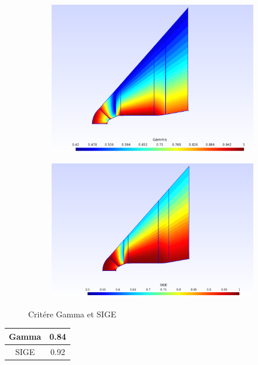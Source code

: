 \begin{figure}[H]
\begin{center}
\begin{subfigure}{0.48\textwidth}
\includegraphics[width=\textwidth]{chapter1_introduction/pictures/gmsh/gamma.png}
\end{subfigure}
\begin{subfigure}{0.48\textwidth}
\includegraphics[width=\textwidth]{chapter1_introduction/pictures/gmsh/critere1.png}
\end{subfigure}
\caption{Critére Gamma et SIGE}
\end{center}
\end{figure}

\begin{center}
\begin{tabular}{|c|c|}%
\hline%
 Gamma& 0.84 \\%
\hline
SIGE  &0.92 \\
\hline
\end{tabular}
\end{center}

